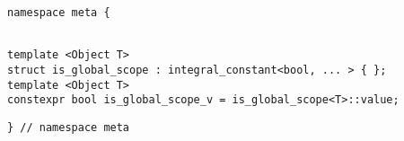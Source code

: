 
\begin{verbatim}
namespace meta {
\end{verbatim}
\begin{verbatim}

template <Object T>
struct is_global_scope : integral_constant<bool, ... > { };
template <Object T>
constexpr bool is_global_scope_v = is_global_scope<T>::value;

\end{verbatim}
\begin{verbatim}
} // namespace meta
\end{verbatim}
